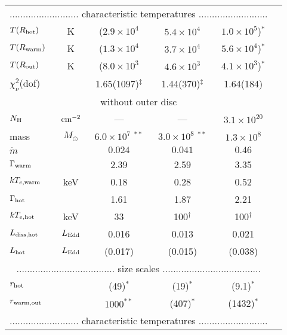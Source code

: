 \documentclass[a4paper,fleqn,usenatbib]{mnras}
\begin{document}
\begin{table}
\begin{tabular}{lccccc}
\multicolumn{5}{c}{.......................... characteristic temperatures ..........................}\\
$T(R_{\rm hot})$ &K&($2.9\times 10^4$&$5.4\times 10^4$&$1.0\times 10^5$)$^\ast$\\
$T(R_{\rm warm})$ &K&($1.3\times 10^4$&$3.7\times 10^4$&$5.6\times 10^4$)$^\ast$\\
$T(R_{\rm out})$ &K&($8.0\times 10^3$&$4.6\times 10^3$&$4.1\times 10^3$)$^\ast$\\
\hline
$\chi^2 _\nu$(dof)&&1.65(1097)$^\ddagger$&1.44(370)$^\ddagger$&1.64(184)\\ 
		\hline
		\hline
		\multicolumn{5}{c}{without outer disc}\\ \hline
$N_{\rm H}$ & ${\rm cm^{-2}}$ & --- & --- & $3.1\times 10^{20}$ \\
mass		&$M_\odot$&$6.0\times10^7$ $^{**}$&$3.0\times 10^8$ $^{**}$&$1.3\times 10^8$ \\
$\dot{m}$ &&$0.024$&$0.041$&$0.46$\\
$\Gamma_{\rm warm}$ &&2.39&2.59&3.35\\
$kT_{e,\rm warm}$ &keV&0.18&0.28&0.52\\
$\Gamma_{\rm hot}$& &1.61&1.87&2.21\\
$kT_{e,\rm hot}$ &keV&33&100$^\dagger$&100$^\dagger$\\
$L_{\rm diss,hot}$&$L_{\rm Edd}$ &0.016&0.013&0.021\\
$L_{\rm hot}$&$L_{\rm Edd}$ &(0.017)&(0.015)&(0.038)\\
\multicolumn{5}{c}{..................................... size scales .....................................}\\
\multicolumn{2}{l}{$r_{\rm hot}$} &(49)$^\ast$&(19)$^\ast$&(9.1)$^\ast$\\
\multicolumn{2}{l}{$r_{\rm warm,out}$} &$1000^{**}$&(407)$^\ast$&(1432)$^\ast$\\
\multicolumn{5}{c}{.......................... characteristic temperatures ..........................}\\

\end{tabular}
\end{table}
\end{document}
